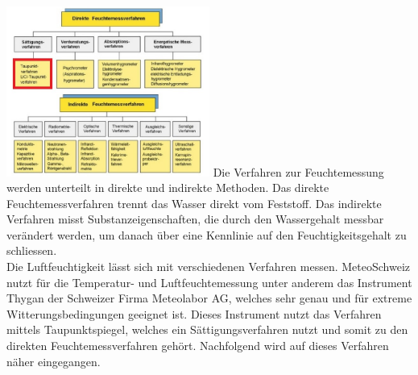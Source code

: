 
\begin{multicols}{2} 

\includegraphics[width=0.5\textwidth]{graphics/verfahren.jpg}
Die Verfahren zur Feuchtemessung werden unterteilt in direkte und indirekte Methoden. Das direkte Feuchtemessverfahren trennt das Wasser direkt vom Feststoff. Das indirekte Verfahren misst Substanzeigenschaften, die durch den Wassergehalt messbar verändert werden, um danach über eine Kennlinie auf den Feuchtigkeitsgehalt zu schliessen.\\
Die Luftfeuchtigkeit lässt sich mit verschiedenen Verfahren messen. MeteoSchweiz nutzt für die Temperatur- und Luftfeuchtemessung unter anderem das Instrument Thygan der Schweizer Firma Meteolabor AG, welches sehr genau und für extreme Witterungsbedingungen geeignet ist. Dieses Instrument nutzt das Verfahren mittels Taupunktspiegel, welches ein Sättigungsverfahren nutzt und somit zu den direkten Feuchtemessverfahren gehört. Nachfolgend wird auf dieses Verfahren näher eingegangen.\\

\end{multicols}